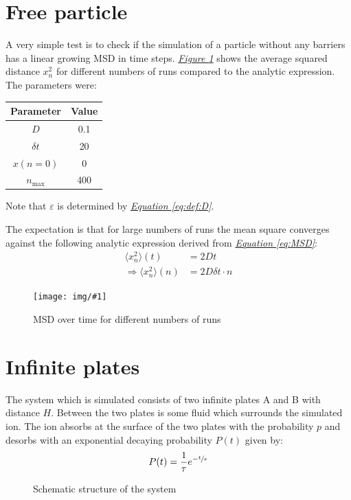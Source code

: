 \documentclass[a4paper, parskip=half]{scrartcl}
\newcommand{\myImage}[2]{
	\begin{figure}[H]
	\centering
	\texttt{[image: img/\#1]}
	\caption{#2}
	\label{pic:#1}
	\end{figure}
}
\newcommand{\myFigRef}[1]{\textit{\hyperref[#1]{Figure \ref*{#1}}}}
\newcommand{\myEqRef}[1]{\textit{\hyperref[eq:#1]{Equation \ref*{eq:#1}}}}
\begin{document}
\newpage
\section{Free particle}
A very simple test is to check if the simulation of a particle without any barriers has a linear growing MSD in time steps. \myFigRef{pic:mean_square} shows the average squared distance $x_n^2$ for different numbers of runs compared to the analytic expression. The parameters were:
\begin{center}
\begin{tabular}{c|c}
Parameter & Value \\\hline
$D$ & 0.1 \\
$\delta t$ & 20 \\
$x(n=0)$ & 0 \\
$n_{\mathrm{max}}$ & 400
\end{tabular}
\end{center}
Note that $\varepsilon$ is determined by \myEqRef{def:D}.

The expectation is that for large numbers of runs the mean square converges against the following analytic expression derived from \myEqRef{MSD}:
\begin{align}
\langle x_n^2\rangle (t) &= 2 D t \\
\Rightarrow\langle x_n^2\rangle (n) &= 2 D \delta t \cdot n
\end{align}
\myImage{mean_square}{MSD over time for different numbers of runs}

\newpage
\section{Infinite plates}
The system which is simulated consists of two infinite plates A and B with distance $H$. Between the two plates is some fluid which surrounds the simulated ion. The ion absorbs at the surface of the two plates with the probability $p$ and desorbs with an exponential decaying probability $P(t)$ given by:
\begin{align}
P(t) = \frac{1}{\tau}e^{- \sfrac{t}{\tau}}
\end{align}
\begin{figure}[H]
\centering
{}
\caption{Schematic structure of the system}
\end{figure}
\end{document}

